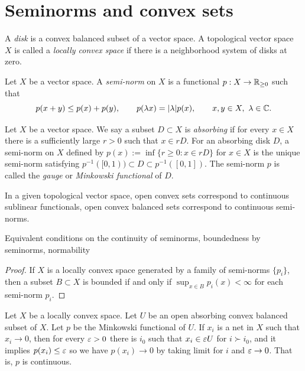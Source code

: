 \documentclass{../../large}
\begin{document}
\section{Seminorms and convex sets}

\begin{prb}
A \emph{disk} is a convex balanced subset of a vector space.
A topological vector space $X$ is called a \emph{locally convex space} if there is a neighborhood system of disks at zero.

\end{prb}

\begin{prb}[Seminorms]
Let $X$ be a vector space.
A \emph{semi-norm} on $X$ is a functional $p:X\to\mathbb{R}_{\ge0}$ such that
\[p(x+y)\le p(x)+p(y),\qquad p(\lambda x)=|\lambda|p(x),\qquad x,y\in X,\ \lambda\in\mathbb{C}.\]


\end{prb}

\begin{prb}
Let $X$ be a vector space.
We say a subset $D\subset X$ is \emph{absorbing} if for every $x\in X$ there is a sufficiently large $r>0$ such that $x\in rD$.
For an absorbing disk $D$, a semi-norm on $X$ defined by $p(x):=\inf\{r\ge0:x\in rD\}$ for $x\in X$ is the unique semi-norm satisfying $p^{-1}([0,1))\subset D\subset p^{-1}([0,1])$.
The semi-norm $p$ is called the \emph{gauge} or \emph{Minkowski functional} of $D$.

In a given topological vector space, open convex sets correspond to continuous sublinear functionals, open convex balanced sets correspond to continuous semi-norms.

Equivalent conditions on the continuity of seminorms,
boundedness by seminorms,
normability
\begin{parts}
\item 
\end{parts}
\end{prb}
\begin{proof}


If $X$ is a locally convex space generated by a family of semi-norms $\{p_i\}$, then a subset $B\subset X$ is bounded if and only if $\sup_{x\in B}p_i(x)<\infty$ for each semi-norm $p_i$.
\end{proof}

Let $X$ be a locally convex space.
Let $U$ be an open absorbing convex balanced subset of $X$.
Let $p$ be the Minkowski functional of $U$.
If $x_i$ is a net in $X$ such that $x_i\to0$, then for every $\varepsilon>0$ there is $i_0$ such that $x_i\in\varepsilon U$ for $i\succ i_0$, and it implies $p(x_i)\le\varepsilon$ so we have $p(x_i)\to0$ by taking limit for $i$ and $\varepsilon\to0$.
That is, $p$ is continuous.
\end{document}
